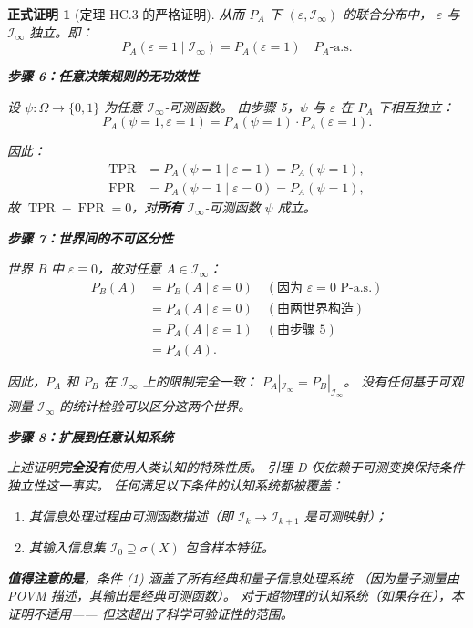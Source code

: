 \documentclass[12pt,a4paper]{article}
\newtheorem{formalproof}[theorem]{正式证明}
\newcommand{\cI}{\mathcal{I}}
\newcommand{\TPR}{\operatorname{TPR}}
\newcommand{\FPR}{\operatorname{FPR}}
\begin{document}
\begin{formalproof}[定理 HC.3 的严格证明]
从而 $P_A$ 下 $(\varepsilon, \cI_{\infty})$ 的联合分布中，
$\varepsilon$ 与 $\cI_{\infty}$ 独立。即：
\begin{equation}
    P_A(\varepsilon=1 \mid \cI_{\infty}) = P_A(\varepsilon=1) \quad \text{$P_A$-a.s.}
\end{equation}

\textbf{步骤 6：任意决策规则的无功效性}

设 $\psi: \Omega \to \{0,1\}$ 为任意 $\cI_{\infty}$-可测函数。
由步骤 5，$\psi$ 与 $\varepsilon$ 在 $P_A$ 下相互独立：
\begin{equation}
    P_A(\psi=1, \varepsilon=1) = P_A(\psi=1) \cdot P_A(\varepsilon=1).
\end{equation}

因此：
\begin{align}
    \TPR &= P_A(\psi=1 \mid \varepsilon=1) = P_A(\psi=1),\\
    \FPR &= P_A(\psi=1 \mid \varepsilon=0) = P_A(\psi=1),
\end{align}
故 $\TPR - \FPR = 0$，对\textbf{所有} $\cI_{\infty}$-可测函数 $\psi$ 成立。

\textbf{步骤 7：世界间的不可区分性}

世界 B 中 $\varepsilon \equiv 0$，故对任意 $A \in \cI_{\infty}$：
\begin{align}
    P_B(A) &= P_B(A \mid \varepsilon=0) \quad (\text{因为 $\varepsilon=0$ P-a.s.})\\
    &= P_A(A \mid \varepsilon=0) \quad (\text{由两世界构造})\\
    &= P_A(A \mid \varepsilon=1) \quad (\text{由步骤 5})\\
    &= P_A(A).
\end{align}

因此，$P_A$ 和 $P_B$ 在 $\cI_{\infty}$ 上的限制完全一致：
$P_A|_{\cI_{\infty}} = P_B|_{\cI_{\infty}}$。
没有任何基于可观测量 $\cI_{\infty}$ 的统计检验可以区分这两个世界。

\textbf{步骤 8：扩展到任意认知系统}

上述证明\textbf{完全没有}使用人类认知的特殊性质。
引理 D 仅依赖于可测变换保持条件独立性这一事实。
任何满足以下条件的认知系统都被覆盖：
\begin{enumerate}
    \item 其信息处理过程由可测函数描述（即 $\cI_k \to \cI_{k+1}$ 是可测映射）；
    \item 其输入信息集 $\cI_0 \supseteq \sigma(X)$ 包含样本特征。
\end{enumerate}

\textbf{值得注意的是}，条件 (1) 涵盖了所有经典和量子信息处理系统
（因为量子测量由 POVM 描述，其输出是经典可测函数）。
对于超物理的认知系统（如果存在），本证明不适用——
但这超出了科学可验证性的范围。

\end{formalproof}
\end{document}
